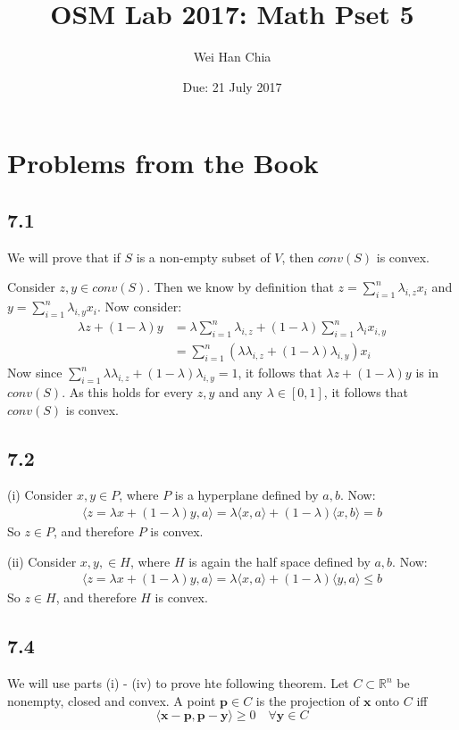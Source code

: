 \documentclass{article}
\newcommand{\inprod}[1]{\langle #1 \rangle}
\begin{document}
	\title{OSM Lab 2017: Math Pset 5}
	\author{Wei Han Chia}
	\date{Due: 21 July 2017}
	\maketitle
	
	\section*{Problems from the Book}
	\subsection*{7.1}
	We will prove that if $S$ is a non-empty subset of $V$, then $conv(S)$ is convex.
	
	Consider $z, y \in conv(S)$. Then we know by definition that $z = \sum_{i=1}^{n} \lambda_{i,z} x_i $ and $y = \sum_{i=1}^{n} \lambda_{i,y} x_i$. Now consider:
	\begin{align*}
	\lambda z + (1 - \lambda) y &= \lambda \sum_{i=1}^{n} \lambda_{i, z} + (1-\lambda) \sum_{i=1}^{n} \lambda_i x_{i,y} \\
	&= \sum_{i=1}^{n} (\lambda \lambda_{i,z} + (1-\lambda) \lambda_{i,y}) x_i 
	\end{align*}
	Now since $ \sum_{i=1}^{n} \lambda \lambda_{i,z} + (1-\lambda) \lambda_{i,y} = 1$, it follows that $\lambda z + (1 -\lambda)y$ is in $conv(S)$. As this holds for every $z,y$ and any $\lambda \in [0,1]$, it follows that $conv(S)$ is convex.
	
	\subsection*{7.2}
	(i) Consider $x, y \in P$, where $P$ is a hyperplane defined by $a, b$. Now:
	\begin{align*}
	\inprod{z = \lambda x + (1- \lambda) y, a} = \lambda \inprod{x, a} + (1- \lambda) \inprod{x, b} = b
	\end{align*}
	So $z \in P$, and therefore $P$ is convex.
	
	\noindent(ii)
	Consider $x, y, \in H$, where $H$ is again the half space defined by $a, b$. Now:
	\begin{align*}
	\inprod{z = \lambda x + (1- \lambda) y, a} = \lambda \inprod{x, a} + (1 -\lambda) \inprod{y,a} \leq b
	\end{align*} 
	So $z \in H$, and therefore $H$ is convex.
	
	\subsection*{7.4}
	We will use parts (i) - (iv) to prove hte following theorem. Let $C \subset \mathbb{R}^n$ be nonempty, closed and convex. A point $\mathbf{p} \in C$ is the projection of $\mathbf{x}$ onto $C$ iff
	\[ \inprod{\mathbf{x} - \mathbf{p}, \mathbf{p} -\mathbf{y}} \geq 0 \quad \forall \mathbf{y} \in C \]
	
\end{document}
